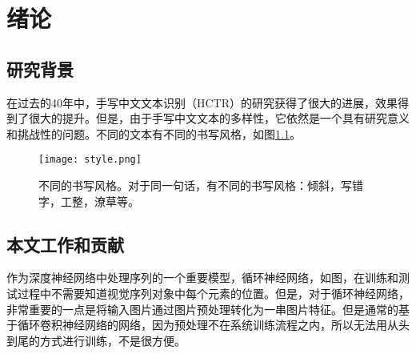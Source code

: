 \documentclass[winfonts]{njuthesis}
\begin{document}


\mainmatter

\chapter{绪论}\label{chapter_introduction}
\section{研究背景}
在过去的40年中，手写中文文本识别（HCTR）的研究获得了很大的进展，效果得到了很大的提升\cite{fujisawa2008forty}。但是，由于手写中文文本的多样性，它依然是一个具有研究意义和挑战性的问题\cite{xu2012touching}。不同的文本有不同的书写风格，如图\ref{fig:style}。 

\begin{figure}[htbp]
   \centering
   \texttt{[image: style.png]} %
   \caption{不同的书写风格。对于同一句话，有不同的书写风格：倾斜，写错字，工整，潦草等。}
   \label{fig:style}
\end{figure}

\section{本文工作和贡献}

作为深度神经网络中处理序列的一个重要模型，循环神经网络，如图，在训练和测试过程中不需要知道视觉序列对象中每个元素的位置。但是，对于循环神经网络，非常重要的一点是将输入图片通过图片预处理转化为一串图片特征\cite{graves2009novel,su2014accurate}。但是通常的基于循环卷积神经网络的网络，因为预处理不在系统训练流程之内，所以无法用从头到尾的方式进行训练，不是很方便。

%
%
%
\end{document}
